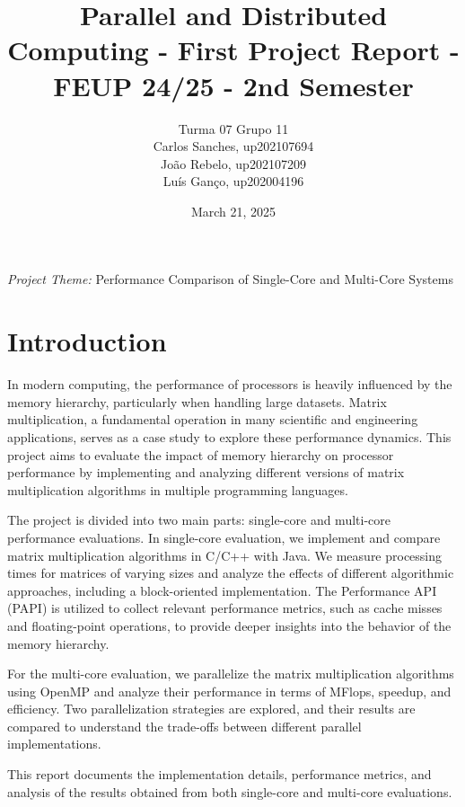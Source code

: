 \documentclass{article}
\title{Parallel and Distributed Computing - First Project Report - FEUP 24/25 - 2nd Semester}
\author{
Turma 07 Grupo 11 \\
Carlos Sanches, up202107694 \\
João Rebelo, up202107209 \\
Luís Ganço, up202004196
}
\date{March 21, 2025}
\begin{document}
\newpage 
\vspace{0.in}

\maketitle
\begin{center}
    \large \textit{Project Theme:} Performance Comparison of Single-Core and Multi-Core Systems
\end{center}
\vspace{1.3in}
\tableofcontents
\newpage %

\section{Introduction}

In modern computing, the performance of processors is heavily influenced by the memory hierarchy, particularly when handling large datasets. Matrix multiplication, a fundamental operation in many scientific and engineering applications, serves as a case study to explore these performance dynamics. This project aims to evaluate the impact of memory hierarchy on processor performance by implementing and analyzing different versions of matrix multiplication algorithms in multiple programming languages.

The project is divided into two main parts: single-core and multi-core performance evaluations. In single-core evaluation, we implement and compare matrix multiplication algorithms in C/C++ with Java. We measure processing times for matrices of varying sizes and analyze the effects of different algorithmic approaches, including a block-oriented implementation. The Performance API (PAPI) is utilized to collect relevant performance metrics, such as cache misses and floating-point operations, to provide deeper insights into the behavior of the memory hierarchy.

For the multi-core evaluation, we parallelize the matrix multiplication algorithms using OpenMP and analyze their performance in terms of MFlops, speedup, and efficiency. Two parallelization strategies are explored, and their results are compared to understand the trade-offs between different parallel implementations.

This report documents the implementation details, performance metrics, and analysis of the results obtained from both single-core and multi-core evaluations. 
\end{document}
